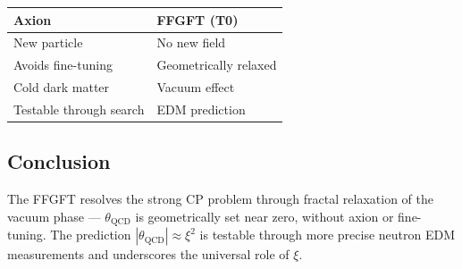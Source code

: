 	\begin{center}
		\begin{tabular}{p{}p{}}
			\textbf{Axion} & \textbf{FFGFT (T0)} \\
			\hline
			New particle & No new field \\
			Avoids fine-tuning & Geometrically relaxed \\
			Cold dark matter & Vacuum effect \\
			Testable through search & EDM prediction \\
		\end{tabular}
	\end{center}
	
	\subsection*{Conclusion}
	
	The FFGFT resolves the strong CP problem through fractal relaxation of the vacuum phase — \(\theta_{\text{QCD}}\) is geometrically set near zero, without axion or fine-tuning. The prediction \(|\theta_{\text{QCD}}| \approx \xi^2\) is testable through more precise neutron EDM measurements and underscores the universal role of \(\xi\).



